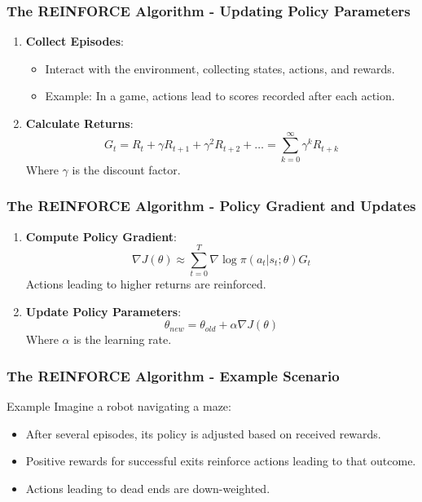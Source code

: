 \documentclass[aspectratio=169]{beamer}
\begin{document}
\begin{frame}[fragile]
    \frametitle{The REINFORCE Algorithm - Updating Policy Parameters}
    \begin{enumerate}
        \item \textbf{Collect Episodes}: 
            \begin{itemize}
                \item Interact with the environment, collecting states, actions, and rewards.
                \item Example: In a game, actions lead to scores recorded after each action.
            \end{itemize}
        \item \textbf{Calculate Returns}:
            \begin{equation}
            G_t = R_t + \gamma R_{t+1} + \gamma^2 R_{t+2} + \ldots = \sum_{k=0}^{\infty} \gamma^k R_{t+k}
            \end{equation}
            Where $\gamma$ is the discount factor.
    \end{enumerate}
\end{frame}

\begin{frame}[fragile]
    \frametitle{The REINFORCE Algorithm - Policy Gradient and Updates}
    \begin{enumerate}[resume]
        \item \textbf{Compute Policy Gradient}:
            \begin{equation}
            \nabla J(\theta) \approx \sum_{t=0}^{T} \nabla \log \pi(a_t | s_t; \theta) G_t
            \end{equation}
            Actions leading to higher returns are reinforced.
        \item \textbf{Update Policy Parameters}:
            \begin{equation}
            \theta_{new} = \theta_{old} + \alpha \nabla J(\theta)
            \end{equation}
            Where $\alpha$ is the learning rate.
    \end{enumerate}
\end{frame}

\begin{frame}[fragile]
    \frametitle{The REINFORCE Algorithm - Example Scenario}
    \begin{block}{Example}
        Imagine a robot navigating a maze:
        \begin{itemize}
            \item After several episodes, its policy is adjusted based on received rewards.
            \item Positive rewards for successful exits reinforce actions leading to that outcome.
            \item Actions leading to dead ends are down-weighted.
        \end{itemize}
    \end{block}
\end{frame}
\end{document}
